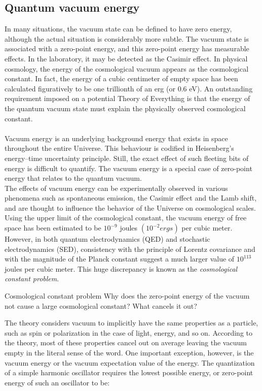 \subsection{Quantum vacuum energy}
In many situations, the vacuum state can be defined to have zero energy, although the actual situation is considerably more subtle. The vacuum state is associated with a zero-point energy, and this zero-point energy has measurable effects. In the laboratory, it may be detected as the Casimir effect. In physical cosmology, the energy of the cosmological vacuum appears as the cosmological constant. In fact, the energy of a cubic centimeter of empty space has been calculated figuratively to be one trillionth of an erg (or $0.6$ eV). An outstanding requirement imposed on a potential Theory of Everything is that the energy of the quantum vacuum state must explain the physically observed cosmological constant.
\\
\\
Vacuum energy is an underlying background energy that exists in space throughout the entire Universe. This behaviour is codified in Heisenberg's energy–time uncertainty principle. Still, the exact effect of such fleeting bits of energy is difficult to quantify. The vacuum energy is a special case of zero-point energy that relates to the quantum vacuum.\\
The effects of vacuum energy can be experimentally observed in various phenomena such as spontaneous emission, the Casimir effect and the Lamb shift, and are thought to influence the behavior of the Universe on cosmological scales. Using the upper limit of the cosmological constant, the vacuum energy of free space has been estimated to be $10^{-9}$ joules $(10^{−2} ergs)$ per cubic meter. However, in both quantum electrodynamics (QED) and stochastic electrodynamics (SED), consistency with the principle of Lorentz covariance and with the magnitude of the Planck constant suggest a much larger value of $10^{113}$ joules per cubic meter. This huge discrepancy is known as the \emph{cosmological constant problem}.
\begin{mybox}{Cosmological constant problem}
	Why does the zero-point energy of the vacuum not cause a large cosmological constant? What cancels it out?
\end{mybox}
The theory considers vacuum to implicitly have the same properties as a particle, such as spin or polarization in the case of light, energy, and so on. According to the theory, most of these properties cancel out on average leaving the vacuum empty in the literal sense of the word. One important exception, however, is the vacuum energy or the vacuum expectation value of the energy. The quantization of a simple harmonic oscillator requires the lowest possible energy, or zero-point energy of such an oscillator to be:
